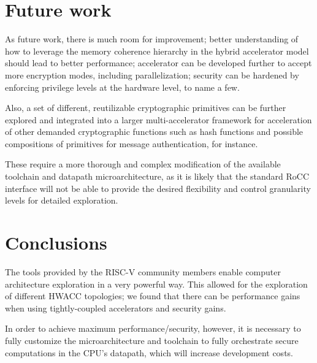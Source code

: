 \documentclass[10pt,conference]{IEEEtran}
\begin{document}
\section{Future work}

As future work, there is much room for improvement; better understanding of how
to leverage the memory coherence hierarchy in the hybrid accelerator model
should lead to better performance; accelerator can be developed further to
accept more encryption modes, including parallelization; security can be
hardened by enforcing privilege levels at the hardware level, to name a few.

Also, a set of different, reutilizable cryptographic primitives can be further
explored and integrated into a larger multi-accelerator framework for
acceleration of other demanded cryptographic functions such as hash functions
and possible compositions of primitives for message authentication, for instance.

These require a more thorough and complex modification of the available
toolchain and datapath microarchitecture, as it is likely that the standard RoCC
interface will not be able to provide the desired flexibility and control
granularity levels for detailed exploration.

\section{Conclusions}

The tools provided by the RISC-V community members enable computer architecture
exploration in a very powerful way. This allowed for the exploration of
different HWACC topologies; we found that there can be performance gains when
using tightly-coupled accelerators and security gains.

In order to achieve maximum performance/security, however, it is necessary to
fully customize the microarchitecture and toolchain to fully orchestrate secure
computations in the CPU's datapath, which will increase development costs.




\end{document}
